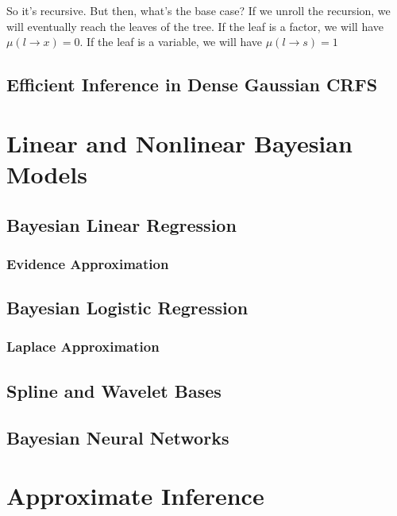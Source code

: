\documentclass[12pt]{article}
\begin{document}
So it's recursive. But then, what's the base case? If we unroll the recursion, we will eventually reach the leaves of the tree.
If the leaf is a factor, we will have $\mu(l \rightarrow x) = 0$.
If the leaf is a variable, we will have $\mu(l \rightarrow s) = 1$

\iffalse
some details: message sending is a function of node doing the sending!
\fi

\subsection{Efficient Inference in Dense Gaussian CRFS}

\section{Linear and Nonlinear Bayesian Models}

\subsection{Bayesian Linear Regression}

\subsubsection{Evidence Approximation}

\subsection{Bayesian Logistic Regression}

\subsubsection{Laplace Approximation}

\subsection{Spline and Wavelet Bases}

\subsection{Bayesian Neural Networks}
\section{Approximate Inference}
\end{document}
